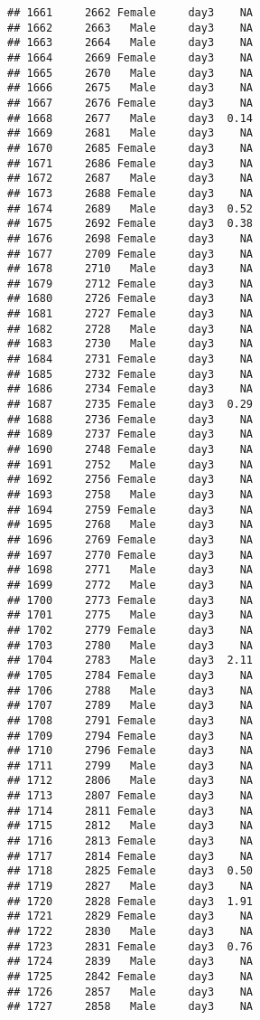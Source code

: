 \documentclass[
]{article}
\begin{document}
\begin{verbatim}
## 1661     2662 Female     day3    NA
## 1662     2663   Male     day3    NA
## 1663     2664   Male     day3    NA
## 1664     2669 Female     day3    NA
## 1665     2670   Male     day3    NA
## 1666     2675   Male     day3    NA
## 1667     2676 Female     day3    NA
## 1668     2677   Male     day3  0.14
## 1669     2681   Male     day3    NA
## 1670     2685 Female     day3    NA
## 1671     2686 Female     day3    NA
## 1672     2687   Male     day3    NA
## 1673     2688 Female     day3    NA
## 1674     2689   Male     day3  0.52
## 1675     2692 Female     day3  0.38
## 1676     2698 Female     day3    NA
## 1677     2709 Female     day3    NA
## 1678     2710   Male     day3    NA
## 1679     2712 Female     day3    NA
## 1680     2726 Female     day3    NA
## 1681     2727 Female     day3    NA
## 1682     2728   Male     day3    NA
## 1683     2730   Male     day3    NA
## 1684     2731 Female     day3    NA
## 1685     2732 Female     day3    NA
## 1686     2734 Female     day3    NA
## 1687     2735 Female     day3  0.29
## 1688     2736 Female     day3    NA
## 1689     2737 Female     day3    NA
## 1690     2748 Female     day3    NA
## 1691     2752   Male     day3    NA
## 1692     2756 Female     day3    NA
## 1693     2758   Male     day3    NA
## 1694     2759 Female     day3    NA
## 1695     2768   Male     day3    NA
## 1696     2769 Female     day3    NA
## 1697     2770 Female     day3    NA
## 1698     2771   Male     day3    NA
## 1699     2772   Male     day3    NA
## 1700     2773 Female     day3    NA
## 1701     2775   Male     day3    NA
## 1702     2779 Female     day3    NA
## 1703     2780   Male     day3    NA
## 1704     2783   Male     day3  2.11
## 1705     2784 Female     day3    NA
## 1706     2788   Male     day3    NA
## 1707     2789   Male     day3    NA
## 1708     2791 Female     day3    NA
## 1709     2794 Female     day3    NA
## 1710     2796 Female     day3    NA
## 1711     2799   Male     day3    NA
## 1712     2806   Male     day3    NA
## 1713     2807 Female     day3    NA
## 1714     2811 Female     day3    NA
## 1715     2812   Male     day3    NA
## 1716     2813 Female     day3    NA
## 1717     2814 Female     day3    NA
## 1718     2825 Female     day3  0.50
## 1719     2827   Male     day3    NA
## 1720     2828 Female     day3  1.91
## 1721     2829 Female     day3    NA
## 1722     2830   Male     day3    NA
## 1723     2831 Female     day3  0.76
## 1724     2839   Male     day3    NA
## 1725     2842 Female     day3    NA
## 1726     2857   Male     day3    NA
## 1727     2858   Male     day3    NA

\end{verbatim}
\end{document}
